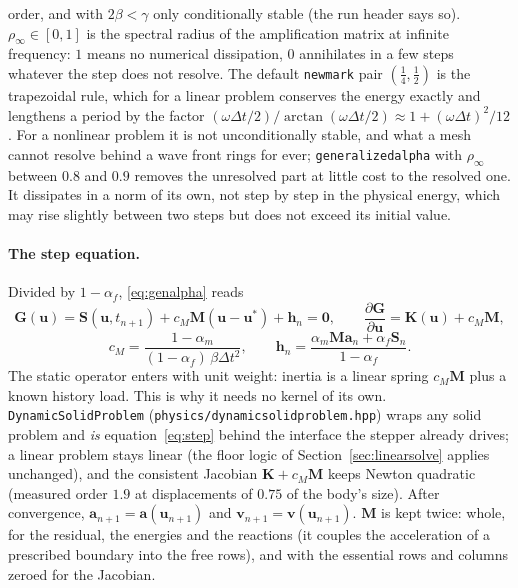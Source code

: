 \documentclass[11pt]{article}
\newcommand{\bK}{\bm{K}}
\newcommand{\bM}{\bm{M}}
\DeclareRobustCommand{\code}[1]{{\def\_{\textunderscore\allowbreak}\texttt{#1}}}
\DeclareRobustCommand{\file}[1]{{\def\_{\textunderscore\allowbreak}\texttt{#1}}}
\begin{document}
order, and with $2\beta < \gamma$ only conditionally stable (the run header
says so).  $\rho_\infty \in [0, 1]$ is the spectral radius of the
amplification matrix at infinite frequency: $1$ means no numerical
dissipation, $0$ annihilates in a few steps whatever the step does not
resolve.  The default \code{newmark} pair $(\tfrac14, \tfrac12)$ is the
trapezoidal rule, which for a linear problem conserves the energy exactly
and lengthens a period by the factor $(\omega\Delta t/2)/\arctan(\omega\Delta
t/2) \approx 1 + (\omega\Delta t)^2/12$.  For a nonlinear problem it is not
unconditionally stable, and what a mesh cannot resolve behind a wave front
rings for ever; \code{generalized\_alpha} with $\rho_\infty$ between $0.8$
and $0.9$ removes the unresolved part at little cost to the resolved one.
It dissipates in a norm of its own, not step by step in the physical
energy, which may rise slightly between two steps but does not exceed its
initial value.

\paragraph{The step equation.}
Divided by $1 - \alpha_f$, \eqref{eq:genalpha} reads
\begin{equation}
  \boxed{\;
  \bm G(\bm u) = \bm S(\bm u, t_{n+1}) + c_M\bM(\bm u - \bm u^*) + \bm h_n = \bm 0,
  \qquad
  \frac{\partial\bm G}{\partial\bm u} = \bK(\bm u) + c_M\bM ,\;}
  \label{eq:step}
\end{equation}
\begin{equation}
  c_M = \frac{1 - \alpha_m}{(1 - \alpha_f)\,\beta\Delta t^2}, \qquad
  \bm h_n = \frac{\alpha_m\bM\bm a_n + \alpha_f\bm S_n}{1 - \alpha_f} .
\end{equation}
The static operator enters with unit weight: inertia is a linear spring
$c_M\bM$ plus a known history load.  This is why it needs no kernel of its
own.  \code{DynamicSolidProblem} (\file{physics/dynamic\_solid\_problem.hpp})
wraps any solid problem and \emph{is} equation~\eqref{eq:step} behind the
interface the stepper already drives; a linear problem stays linear (the
floor logic of Section~\ref{sec:linearsolve} applies unchanged), and the
consistent Jacobian $\bK + c_M\bM$ keeps Newton quadratic (measured order
$1.9$ at displacements of $0.75$ of the body's size).  After convergence,
$\bm a_{n+1} = \bm a(\bm u_{n+1})$ and $\bm v_{n+1} = \bm v(\bm u_{n+1})$.
$\bM$ is kept twice: whole, for the residual, the energies and the
reactions (it couples the acceleration of a prescribed boundary into the
free rows), and with the essential rows and columns zeroed for the
Jacobian.
\end{document}
